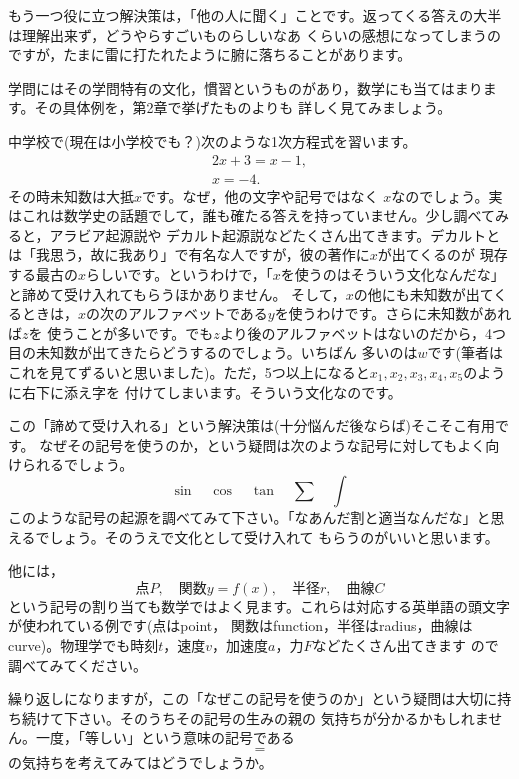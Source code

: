 \documentclass[./main]{subfiles}
\begin{document}
もう一つ役に立つ解決策は，「他の人に聞く」ことです。返ってくる答えの大半は理解出来ず，どうやらすごいものらしいなあ
くらいの感想になってしまうのですが，たまに雷に打たれたように腑に落ちることがあります。


学問にはその学問特有の文化，慣習というものがあり，数学にも当てはまります。その具体例を，第2章で挙げたものよりも
詳しく見てみましょう。

中学校で(現在は小学校でも？)次のような1次方程式を習います。
\begin{gather*}
2x + 3 = x - 1, \\
x = -4.
\end{gather*}
その時未知数は大抵$x$です。なぜ，他の文字や記号ではなく
$x$なのでしょう。実はこれは数学史の話題でして，誰も確たる答えを持っていません。少し調べてみると，アラビア起源説や
デカルト起源説などたくさん出てきます。デカルトとは「我思う，故に我あり」で有名な人ですが，彼の著作に$x$が出てくるのが
現存する最古の$x$らしいです。というわけで，「$x$を使うのはそういう文化なんだな」と諦めて受け入れてもらうほかありません。
そして，$x$の他にも未知数が出てくるときは，$x$の次のアルファベットである$y$を使うわけです。さらに未知数があれば$z$を
使うことが多いです。でも$z$より後のアルファベットはないのだから，4つ目の未知数が出てきたらどうするのでしょう。いちばん
多いのは$w$です(筆者はこれを見てずるいと思いました)。ただ，5つ以上になると$x_1,x_2,x_3,x_4,x_5$のように右下に添え字を
付けてしまいます。そういう文化なのです。

この「諦めて受け入れる」という解決策は(十分悩んだ後ならば)そこそこ有用です。
なぜその記号を使うのか，という疑問は次のような記号に対してもよく向けられるでしょう。
\[
\sin \quad \cos \quad \tan \quad \sum \quad \int
\]
このような記号の起源を調べてみて下さい。「なあんだ割と適当なんだな」と思えるでしょう。そのうえで文化として受け入れて
もらうのがいいと思います。

他には，
\[点P,\quad 関数y=f(x),\quad 半径r, \quad 曲線C \]
という記号の割り当ても数学ではよく見ます。これらは対応する英単語の頭文字が使われている例です(点はpoint，
関数はfunction，半径はradius，曲線はcurve)。物理学でも時刻$t$，速度$v$，加速度$a$，力$F$などたくさん出てきます
ので調べてみてください。

繰り返しになりますが，この「なぜこの記号を使うのか」という疑問は大切に持ち続けて下さい。そのうちその記号の生みの親の
気持ちが分かるかもしれません。一度，「等しい」という意味の記号である
\[ = \]
の気持ちを考えてみてはどうでしょうか。

\end{document}
